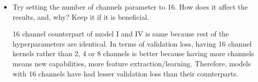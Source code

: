 \documentclass[12pt]{article}
\begin{document}
\begin{itemize}
        
        \item Try setting the number of channels parameter to 16. How does it affect the results, and, why? Keep it if it is beneficial. 
        
		\begin{minipage}{.95\textwidth}
			\begin{minipage}{0.45\textwidth}
				\centering
				\captionsetup{width=1.\textwidth}
			\end{minipage}
			 \hfill
			\begin{minipage}{0.45\textwidth}
				16 channel counterpart of model I and IV is same because rest of the hyperparameters are identical. In terms of validation loss, having 16 channel kernels rather than 2, 4 or 8 channels is better because having more channels means new capabilities, more feature extraction/learning. Therefore, models with 16 channels have had lesser validation loss than their counterparts.
			\end{minipage}
		\end{minipage} \\
		
		\pagebreak


\end{itemize}
\end{document}
